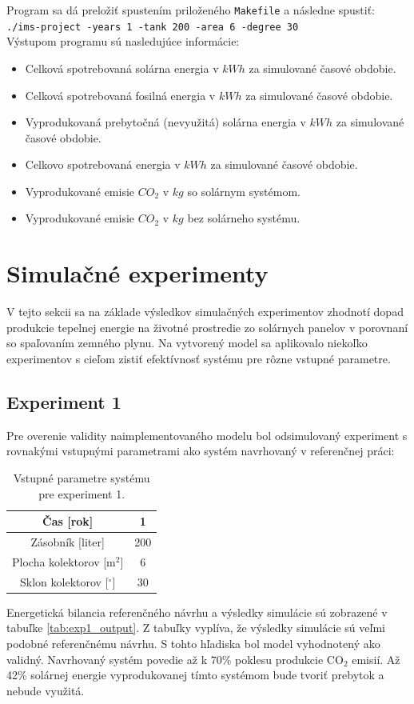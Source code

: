 \documentclass[a4paper, 11pt]{article}
\begin{document}
Program sa dá preložiť spustením priloženého \texttt{Makefile} a následne spustiť:\\
\texttt{./ims-project -years 1 -tank 200 -area 6 -degree 30} \\
Výstupom programu sú nasledujúce informácie:
\begin{itemize}
	\item Celková spotrebovaná solárna energia v $kWh$ za simulované časové obdobie.
	\item Celková spotrebovaná fosilná energia v $kWh$ za simulované časové obdobie.
	\item Vyprodukovaná prebytočná (nevyužitá) solárna energia v $kWh$ za simulované časové obdobie.
	\item Celkovo spotrebovaná energia v $kWh$ za simulované časové obdobie.
	\item Vyprodukované emisie $CO_2$ v $kg$ so solárnym systémom.
	\item Vyprodukované emisie $CO_2$ v $kg$ bez solárneho systému.
\end{itemize}

\section{Simulačné experimenty}
V tejto sekcii sa na základe výsledkov simulačných experimentov zhodnotí dopad produkcie tepelnej energie na životné prostredie zo solárnych panelov v porovnaní so spaľovaním zemného plynu. Na vytvorený model sa aplikovalo niekoľko experimentov s cieľom zistiť efektívnosť systému pre rôzne vstupné parametre.

\subsection{Experiment 1} \label{experiment_1}
Pre overenie validity naimplementovaného modelu bol odsimulovaný experiment s rovnakými vstupnými parametrami ako systém navrhovaný v referenčnej práci\cite{bc_solar_system}:

\begin{table}[H]
	\centering
	\begin{tabular}{|c|c|}
		\hline
		Čas {[}rok{]} & 1 \\ \hline
		Zásobník {[}liter{]} & 200 \\ \hline
		Plocha kolektorov {[}m$^2${]} & 6 \\ \hline
		Sklon kolektorov {[}$^{\circ}${]} & 30 \\ \hline
	\end{tabular}
	\caption{Vstupné parametre systému pre experiment 1.}
	\label{tab:exp1_input}
\end{table}
Energetická bilancia referenčného návrhu\cite{bc_solar_system} a výsledky simulácie sú zobrazené v tabuľke \ref{tab:exp1_output}. Z tabuľky vyplíva, že výsledky simulácie sú veľmi podobné referenčnému návrhu. S tohto hľadiska bol model vyhodnotený ako validný. Navrhovaný systém povedie až k 70\% poklesu produkcie CO$_2$ emisií. Až 42\% solárnej energie vyprodukovanej tímto systémom bude tvoriť prebytok a nebude využitá.
\end{document}
